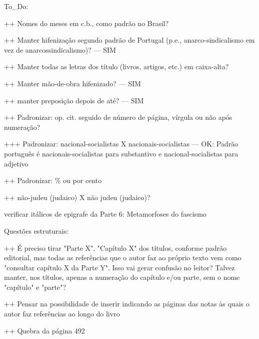 To_Do:

++ Nomes do meses em c.b., como padrão no Brasil?

++ Manter hifenização segundo padrão de Portugal (p.e., anarco-sindicalismo em vez de anarcossindicalismo)? --- SIM

++ Manter todas as letras dos título (livros, artigos, etc.) em caixa-alta?

++ Manter mão-de-obra hifenizado? --- SIM

++ manter preposição depois de até? --- SIM

++ Padronizar: op. cit. seguido de número de página, vírgula ou não após numeração?


+++ Padronizar: nacional-socialistas X nacionais-socialistas --- OK: Padrão português é nacionais-socialistas para substantivo e nacional-socialistas para adjetivo

++ Padronizar: \% ou por cento

++ não-judeu (judaico) X não judeu (judaico)?

verificar itálicos de epigrafe da Parte 6: Metamorfoses do fascismo

Questões estruturais:

++ É preciso tirar "Parte X", "Capítulo X" dos títulos, conforme padrão editorial, mas todas as referências que o autor faz ao próprio texto vem como "consultar capítulo X da Parte Y". Isso vai gerar confusão no leitor? Talvez manter, nos títulos, apenas a numeração do capítulo e/ou parte, sem o nome "capítulo" e "parte"?

++ Pensar na possibilidade de inserir \pageref indicando as páginas das notas às quais o autor faz referências ao longo do livro 

++ Quebra da página 492


